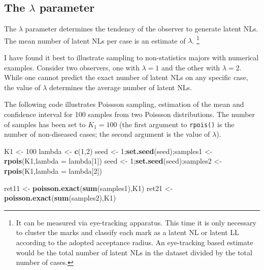\documentclass[
]{book}
\newenvironment{Shaded}{\begin{snugshade}}{\end{snugshade}}
\newcommand{\DataTypeTok}[1]{\textcolor[rgb]{0.13,0.29,0.53}{#1}}
\newcommand{\DecValTok}[1]{\textcolor[rgb]{0.00,0.00,0.81}{#1}}
\newcommand{\KeywordTok}[1]{\textcolor[rgb]{0.13,0.29,0.53}{\textbf{#1}}}
\newcommand{\NormalTok}[1]{#1}
\newcommand{\StringTok}[1]{\textcolor[rgb]{0.31,0.60,0.02}{#1}}
\begin{document}
\hypertarget{rsm-summary-lambda-parameter}{%
\subsection{\texorpdfstring{The \(\lambda\) parameter}{The \textbackslash lambda parameter}}\label{rsm-summary-lambda-parameter}}

The \(\lambda\) parameter determines the tendency of the observer to generate latent NLs. The mean number of latent NLs per case is an estimate of \(\lambda\). \footnote{It can be measured via eye-tracking apparatus. This time it is only necessary to cluster the marks and classify each mark as a latent NL or latent LL according to the adopted acceptance radius. An eye-tracking based estimate would be the total number of latent NLs in the dataset divided by the total number of cases.}

I have found it best to illustrate sampling to non-statistics majors with numerical examples. Consider two observers, one with \(\lambda = 1\) and the other with \(\lambda = 2\). While one cannot predict the exact number of latent NLs on any specific case, the value of \(\lambda\) determines the average number of latent NLs.

The following code illustrates Poissson sampling, estimation of the mean and confidence interval for 100 samples from two Poissson distributions. The number of samples has been set to \(K_1=100\) (the first argument to \texttt{rpois()} is the number of non-diseased cases; the second argument is the value of \(\lambda\)).

\begin{Shaded}
\begin{Highlighting}[]
\NormalTok{K1 <-}\StringTok{ }\DecValTok{100}
\NormalTok{lambda <-}\StringTok{ }\KeywordTok{c}\NormalTok{(}\DecValTok{1}\NormalTok{,}\DecValTok{2}\NormalTok{)}
\NormalTok{seed <-}\StringTok{ }\DecValTok{1}\NormalTok{;}\KeywordTok{set.seed}\NormalTok{(seed);samples1 <-}\StringTok{ }\KeywordTok{rpois}\NormalTok{(K1,}\DataTypeTok{lambda =}\NormalTok{ lambda[}\DecValTok{1}\NormalTok{])}
\NormalTok{seed <-}\StringTok{ }\DecValTok{1}\NormalTok{;}\KeywordTok{set.seed}\NormalTok{(seed);samples2 <-}\StringTok{ }\KeywordTok{rpois}\NormalTok{(K1,}\DataTypeTok{lambda =}\NormalTok{ lambda[}\DecValTok{2}\NormalTok{])}

\NormalTok{ret11 <-}\StringTok{ }\KeywordTok{poisson.exact}\NormalTok{(}\KeywordTok{sum}\NormalTok{(samples1),K1)}
\NormalTok{ret21 <-}\StringTok{ }\KeywordTok{poisson.exact}\NormalTok{(}\KeywordTok{sum}\NormalTok{(samples2),K1)}
\end{Highlighting}
\end{Shaded}
\end{document}
